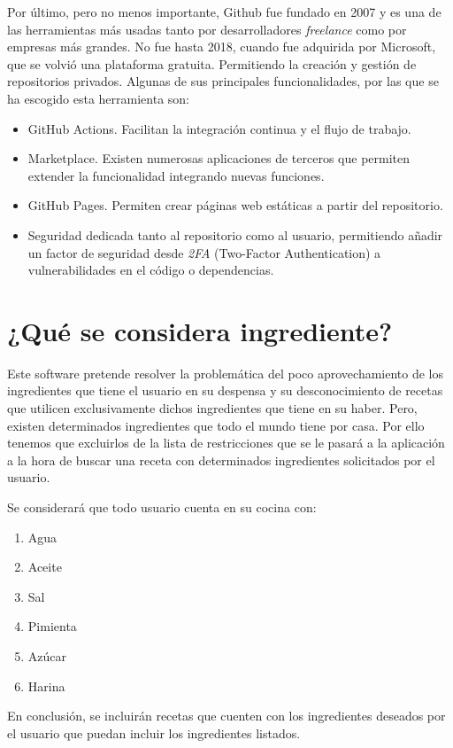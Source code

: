 Por último, pero no menos importante, Github fue fundado en 2007 y es una de las herramientas más usadas tanto por desarrolladores \emph{freelance} como por empresas más grandes. No fue hasta 2018, cuando fue adquirida por Microsoft, que se volvió una plataforma gratuita. Permitiendo la creación y gestión de repositorios privados. Algunas de sus principales funcionalidades, por las que se ha escogido esta herramienta son:
\begin{itemize}
    \item GitHub Actions. Facilitan la integración continua y el flujo de trabajo.
    \item Marketplace. Existen numerosas aplicaciones de terceros que permiten extender la funcionalidad integrando nuevas funciones.
    \item GitHub Pages. Permiten crear páginas web estáticas a partir del repositorio. 
    \item Seguridad dedicada tanto al repositorio como al usuario, permitiendo añadir un factor de seguridad desde \emph{2FA} (Two-Factor Authentication) a vulnerabilidades en el código o dependencias. 
\end{itemize}

\section{¿Qué se considera ingrediente?}
Este software pretende resolver la problemática del poco aprovechamiento de los ingredientes que tiene el usuario en su despensa y su desconocimiento de recetas que utilicen exclusivamente dichos ingredientes que tiene en su haber. Pero, existen determinados ingredientes que todo el mundo tiene por casa. Por ello tenemos que excluirlos de la lista de restricciones que se le pasará a la aplicación a la hora de buscar una receta con determinados ingredientes solicitados por el usuario. 

Se considerará que todo usuario cuenta en su cocina con: 
\begin{enumerate}
    \item Agua
    \item Aceite
    \item Sal
    \item Pimienta
    \item Azúcar
    \item Harina
\end{enumerate}

En conclusión, se incluirán recetas que cuenten con los ingredientes deseados por el usuario que puedan incluir los ingredientes listados.